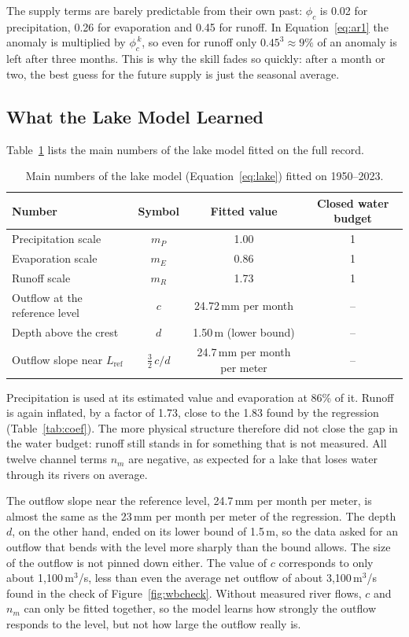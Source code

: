 \documentclass{article}
\begin{document}
The supply terms are barely predictable from their own past: $\phi_c$ is 0.02 for
precipitation, 0.26 for evaporation and 0.45 for runoff. In Equation~\ref{eq:ar1} the anomaly is
multiplied by $\phi_c^{\,k}$, so even for runoff only $0.45^3 \approx 9\%$ of an anomaly is left
after three months. This is why the skill fades so quickly: after a month or two, the best guess
for the future supply is just the seasonal average.

\subsection{What the Lake Model Learned}
\label{sec:lakeresult}

Table~\ref{tab:lakeparams} lists the main numbers of the lake model fitted on the full record.

\begin{table}[htbp]
\centering
\caption{Main numbers of the lake model (Equation~\ref{eq:lake}) fitted on 1950--2023.}
\label{tab:lakeparams}
\begin{tabular}{||l|c|c|c||}
\hline\hline
Number & Symbol & Fitted value & Closed water budget \\
\hline\hline
Precipitation scale & $m_P$ & 1.00 & 1 \\
Evaporation scale & $m_E$ & 0.86 & 1 \\
Runoff scale & $m_R$ & 1.73 & 1 \\
Outflow at the reference level & $c$ & 24.72\,mm per month & -- \\
Depth above the crest & $d$ & 1.50\,m (lower bound) & -- \\
Outflow slope near $L_{\mathrm{ref}}$ & $\tfrac{3}{2}\,c/d$ & 24.7\,mm per month per meter & -- \\
\hline\hline
\end{tabular}
\end{table}

Precipitation is used at its estimated value and evaporation at 86\% of it. Runoff is again
inflated, by a factor of 1.73, close to the 1.83 found by the regression (Table~\ref{tab:coef}).
The more physical structure therefore did not close the gap in the water budget: runoff still
stands in for something that is not measured. All twelve channel terms $n_m$ are negative, as
expected for a lake that loses water through its rivers on average.

The outflow slope near the reference level, 24.7\,mm per month per meter, is almost the same as
the 23\,mm per month per meter of the regression. The depth $d$, on the other hand, ended on its
lower bound of 1.5\,m, so the data asked for an outflow that bends with the level more sharply
than the bound allows. The size of the outflow is not pinned down either. The value of $c$
corresponds to only about 1,100\,m$^3$/s, less than even the average net outflow of about
3,100\,m$^3$/s found in the check of Figure~\ref{fig:wbcheck}. Without measured river flows, $c$
and $n_m$ can only be fitted together, so the model learns how strongly the outflow responds to
the level, but not how large the outflow really is.
\end{document}
